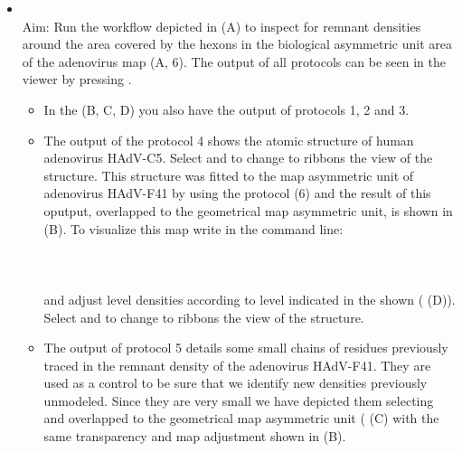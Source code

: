 \begin{itemize}
                \item {}\\
                Aim: Run the \scipion workflow depicted in  (A) to inspect for remnant densities around the area covered by the hexons in the biological asymmetric unit area of the adenovirus map (A, 6). The output of all protocols can be seen in the \chimera viewer by pressing . 
                \begin{itemize}
                        \item In the  (B, C, D) you also have the output of protocols 1, 2 and 3. 
                        \item The output of the protocol 4 shows the atomic structure of human adenovirus HAdV-C5. Select  and  to change to ribbons the view of the structure. This structure was fitted to the map asymmetric unit of adenovirus HAdV-F41 by using the protocol  (6) and the result of this oputput, overlapped to the geometrical map asymmetric unit, is shown in (B). To visualize this map write in the \chimera command line:\\
                        \\
                        \\
                        \\
                        and adjust level densities according to level indicated in the shown  ( (D)). Select  and  to change to ribbons the view of the structure.
                        \item The output of protocol 5 details some small chains of  residues previously traced in the remnant density of the adenovirus HAdV-F41. They are used as a control to be sure that we identify new densities previously unmodeled. Since they are very small we have depicted them selecting  and overlapped to the geometrical map asymmetric unit ( (C) with the same transparency and map adjustment shown in (B).

\end{itemize}
\end{itemize}

